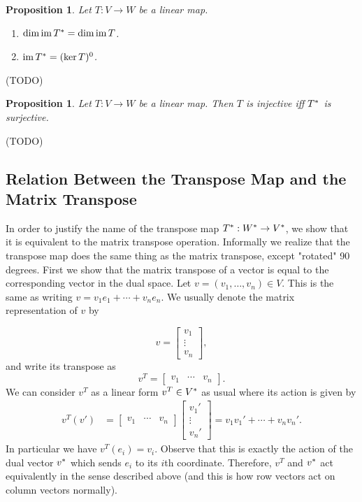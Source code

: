\documentclass[12pt]{article}
\theoremstyle{definition}
\theoremstyle{plain}
\newtheorem{proposition}[theorem] {Proposition}
\numberwithin{equation}{section}
\theoremstyle{definition}
\begin{document}
\begin{proposition}
Let $ T : V \to W $ be a linear map.
\begin{enumerate}
\item $ \dim \operatorname{im} T^{*} = \dim \operatorname{im} T$.
\item $ \operatorname{im} T^{*} = (\ker T)^0 $.
\end{enumerate}
\end{proposition}
(TODO)

\begin{proposition}
Let $ T : V \to W $ be a linear map. Then $ T $ is injective iff $ T^{*} $ is surjective.
\end{proposition}
(TODO)

\subsection{Relation Between the Transpose Map and the Matrix Transpose}

In order to justify the name of the transpose map $ T^{*} : W^{*} \to V^{*} $, we show that it is equivalent to the matrix transpose operation. Informally we realize that the transpose map does the same thing as the matrix transpose, except "rotated" 90 degrees. First we show that the matrix transpose of a vector is equal to the corresponding vector in the dual space. Let $ v = (v_1, \ldots, v_n) \in V$. This is the same as writing $ v = v_1 e_1 + \cdots + v_n e_n $. We usually denote the matrix representation of $ v $ by 

\[ v = \begin{bmatrix}
	v_1 \\
	\vdots \\
	v_n
\end{bmatrix},\]
and write its transpose as
\[v^T = \begin{bmatrix}
	v_1 & \cdots & v_n
\end{bmatrix}.\]
We can consider $ v^T $ as a linear form $ v^T \in V^{*} $ as usual where its action is given by 
\begin{align*}
	v^T (v') &= \begin{bmatrix}
	v_1 & \cdots & v_n
\end{bmatrix} \begin{bmatrix}
	v_1'\\
	\vdots \\
	v_n'
\end{bmatrix} = v_1 v_1' + \cdots + v_n v_n'.
\end{align*}
In particular we have $ v^T(e_i) = v_i $. Observe that this is exactly the action of the dual vector $ v^{*} $ which sends $ e_i $ to its $ i $th coordinate. Therefore, $ v^T $ and $ v^{*} $ act equivalently in the sense described above (and this is how row vectors act on column vectors normally).
\end{document}
